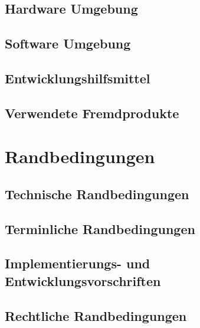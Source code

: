 \subsection{Hardware Umgebung}
\label{subsec:hardware_umgebung}


\subsection{Software Umgebung}
\label{subsec:software_umgebung}


\subsection{Entwicklungshilfsmittel}
\label{subsec:entwicklungshilfsmittel}


\subsection{Verwendete Fremdprodukte}
\label{subsec:fremdprodukte}



\section{Randbedingungen}

\subsection{Technische Randbedingungen}


\subsection{Terminliche Randbedingungen}
\label{subsec:terminliche_randbedingungen}


\subsection{Implementierungs- und Entwicklungsvorschriften}


\subsection{Rechtliche Randbedingungen}


